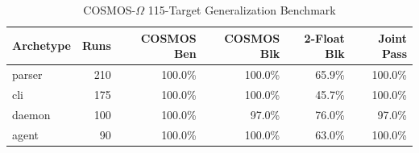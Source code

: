 \begin{table}[t]
\centering
\caption{COSMOS-$\Omega$ 115-Target Generalization Benchmark}
\begin{tabular}{lrrrrr}
\hline
Archetype & Runs & COSMOS Ben & COSMOS Blk & 2-Float Blk & Joint Pass \\
\hline
parser & 210 & 100.0\% & 100.0\% & 65.9\% & 100.0\% \\
cli & 175 & 100.0\% & 100.0\% & 45.7\% & 100.0\% \\
daemon & 100 & 100.0\% & 97.0\% & 76.0\% & 97.0\% \\
agent & 90 & 100.0\% & 100.0\% & 63.0\% & 100.0\% \\
\hline
\end{tabular}
\end{table}
